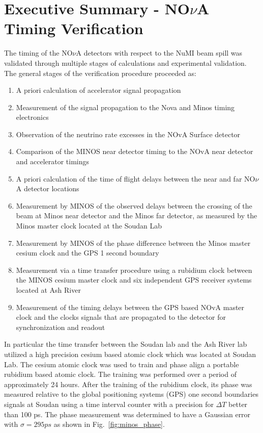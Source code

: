 \section{Executive Summary - NO$\nu$A Timing Verification}

The timing of the NO$\nu$A detectors with respect to the NuMI beam spill was validated through multiple stages of calculations and experimental validation.  The general stages of the verification procedure proceeded as:

\begin{enumerate}
\item A priori calculation of accelerator signal propagation 
\item Measurement of the signal propagation to the Nova and Minos timing electronics
\item Observation of the neutrino rate excesses in the NOvA Surface detector
\item Comparison of the MINOS near detector timing to the NOvA near detector and accelerator timings
\item A priori calculation of the time of flight delays between the near and far NO$\nu$A detector locations 
\item Measurement by MINOS of the observed delays between the crossing of the beam at Minos near detector and the Minos far detector, as measured by the Minos master clock located at the Soudan Lab
\item Measurement by MINOS of the phase difference between the Minos master cesium clock and the GPS 1 second boundary
\item Measurement via a time transfer procedure using a rubidium clock between the MINOS cesium master clock and six independent GPS receiver systems located at Ash River
\item Measurement of the timing delays between the GPS based NOvA master clock and the clocks signals that are propagated to the detector for synchronization and readout 
\end{enumerate}

In particular the time transfer between the Soudan lab and the Ash River lab utilized a high precision cesium based atomic clock which was located at Soudan Lab.  The cesium atomic clock was used to train and phase align a portable rubidium based atomic clock.  The training was performed over a period of approximately 24 hours.  After the training of the rubidium clock, its phase was measured relative to the global positioning systems (GPS) one second boundaries signals at Soudan using a time interval counter with a precision for $\Delta T$ better than 100 ps.  The phase measurement was determined to have a Gaussian error with $\sigma=295ps$ as shown in Fig.~\ref{fig:minos_phase}.

